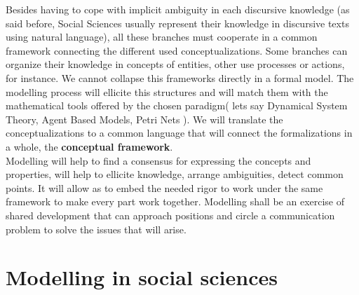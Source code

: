 \documentclass[11pt,oneside,a4paper,openright]{report}
\begin{document}
Besides having to cope with implicit ambiguity in each discursive knowledge (as said before, Social Sciences usually represent their knowledge in discursive texts using natural language), all these branches must cooperate in a common framework connecting the different used conceptualizations. Some branches can organize their knowledge in concepts of entities, other use processes or actions, for instance. We cannot collapse this frameworks directly in a formal model. The modelling process will ellicite this structures and will match them with the mathematical tools offered by the chosen paradigm( lets say Dynamical System Theory, Agent Based Models, Petri Nets ). We will translate the conceptualizations to a common language that will connect the formalizations in a whole, the \textbf{conceptual framework}.\\
Modelling will help to find a consensus for expressing the concepts and properties, will help to ellicite knowledge, arrange ambiguities, detect common points. It will allow as to embed the needed rigor to work under the same framework to make every part work together. Modelling shall be an exercise of shared development that can approach positions and circle a communication problem to solve the issues that will arise.



\section{Modelling in social sciences}
\label{sec:modelsinSC}


\end{document}

